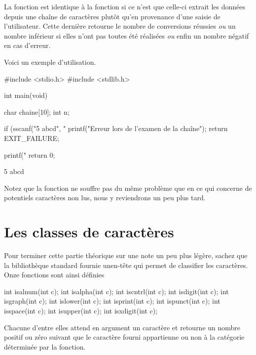 La fonction  est identique à la fonction
 si ce n'est que celle-ci extrait les données depuis une
chaîne de caractères plutôt qu'en provenance d'une saisie de
l'utilisateur. Cette dernière retourne le nombre de conversions réussies
\emph{ou} un nombre inférieur si elles n'ont pas toutes été réalisées
\emph{ou} enfin un nombre négatif en cas d'erreur.

Voici un exemple d'utilisation.

\begin{C}
#include <stdio.h>
#include <stdlib.h>


int main(void)
{
    char chaine[10];
    int n;

    if (sscanf("5 abcd", "%
    {
        printf("Erreur lors de l'examen de la chaîne\n");
        return EXIT_FAILURE;
    }

    printf("%
    return 0;
}
\end{C}

\begin{C}
5 abcd
\end{C}

\begin{infobox} 
Notez que la fonction  ne souffre pas du même problème
que  en ce qui concerne de potentiels caractères non lus,
nous y reviendrons un peu plus tard.
\end{infobox}

\section{Les classes de caractères}
\label{les-classes-de-caracteres}

Pour terminer cette partie théorique sur une note un
peu plus légère, sachez que la bibliothèque standard 
fournie unen-tête 
qui permet de classifier les caractères. Onze fonctions sont
ainsi définies

\begin{C}
int isalnum(int c);
int isalpha(int c);
int iscntrl(int c);
int isdigit(int c);
int isgraph(int c);
int islower(int c);
int isprint(int c);
int ispunct(int c);
int isspace(int c);
int isupper(int c);
int isxdigit(int c);
\end{C}

Chacune d'entre elles attend en argument un caractère et retourne un
nombre positif ou zéro suivant que le caractère fourni appartienne ou
non à la catégorie déterminée par la fonction.

